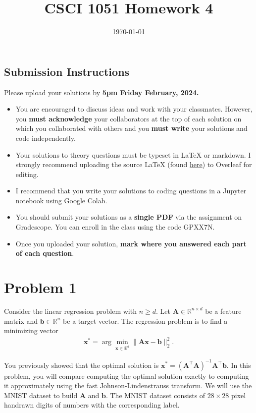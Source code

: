 \documentclass{article}
\title{CSCI 1051 Homework 4}
\date{\today}
\begin{document}
\maketitle

\subsection*{Submission Instructions}

Please upload your solutions by
\textbf{5pm Friday February, 2024.}
\begin{itemize}
\item You are encouraged to discuss ideas
and work with your classmates. However, you
\textbf{must acknowledge} your collaborators
at the top of each solution on which
you collaborated with others 
and you \textbf{must write} your solutions and code independently.
\item Your solutions to theory questions must
be typeset in LaTeX or markdown.
I strongly recommend uploading the source LaTeX (found 
\href{https://www.rtealwitter.com/rads2024/psets/pset4.tex}{here})
to Overleaf for editing.
\item I recommend that you write your solutions to coding questions in a Jupyter notebook using Google Colab.
\item You should submit your solutions as a \textbf{single PDF} via the assignment on Gradescope. You can enroll in the class using the code GPXX7N.
\item Once you uploaded your solution, \textbf{mark where you answered each part of each question}.
\end{itemize}

\newpage

\section*{Problem 1}

Consider the linear regression problem with $n \geq d$.
Let $\mathbf{A} \in \mathbb{R}^{n \times d}$ be a feature matrix and $\mathbf{b} \in \mathbb{R}^n$ be a target vector.
The regression problem is to find a minimizing vector
\begin{align*}
\mathbf{x}^* = \arg \min_{\mathbf{x} \in \mathbb{R}^d}
\| \mathbf{Ax} - \mathbf{b} \|_2^2.
\end{align*}

You previously showed that the optimal solution is $\mathbf{x}^* = \left(\mathbf{A}^\top \mathbf{A} \right)^{-1} \mathbf{A}^\top \mathbf{b}$.
In this problem, you will compare computing the optimal solution exactly to computing it approximately using the fast Johnson-Lindenstrauss transform.
We will use the MNIST dataset to build $\mathbf{A}$ and $\mathbf{b}$.
The MNIST dataset consists of $28 \times 28$ pixel handrawn digits of numbers with the corresponding label.
\end{document}
